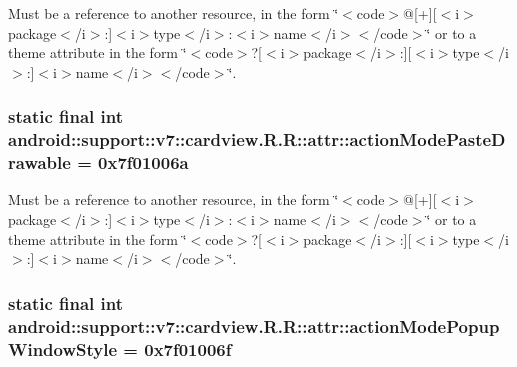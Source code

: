 Must be a reference to another resource, in the form \char`\"{}$<$code$>$@\mbox{[}+\mbox{]}\mbox{[}$<$i$>$package$<$/i$>$:\mbox{]}$<$i$>$type$<$/i$>$:$<$i$>$name$<$/i$>$$<$/code$>$\char`\"{} or to a theme attribute in the form \char`\"{}$<$code$>$?\mbox{[}$<$i$>$package$<$/i$>$:\mbox{]}\mbox{[}$<$i$>$type$<$/i$>$:\mbox{]}$<$i$>$name$<$/i$>$$<$/code$>$\char`\"{}. \hypertarget{classandroid_1_1support_1_1v7_1_1cardview_1_1_r_1_1attr_e3aac7d0f398623a4247e55c5359a1e8}{
\subsubsection[{actionModePasteDrawable}]{\setlength{\rightskip}{0pt plus 5cm}static final int android::support::v7::cardview.R.R::attr::actionModePasteDrawable = 0x7f01006a}}
\label{classandroid_1_1support_1_1v7_1_1cardview_1_1_r_1_1attr_e3aac7d0f398623a4247e55c5359a1e8}


Must be a reference to another resource, in the form \char`\"{}$<$code$>$@\mbox{[}+\mbox{]}\mbox{[}$<$i$>$package$<$/i$>$:\mbox{]}$<$i$>$type$<$/i$>$:$<$i$>$name$<$/i$>$$<$/code$>$\char`\"{} or to a theme attribute in the form \char`\"{}$<$code$>$?\mbox{[}$<$i$>$package$<$/i$>$:\mbox{]}\mbox{[}$<$i$>$type$<$/i$>$:\mbox{]}$<$i$>$name$<$/i$>$$<$/code$>$\char`\"{}. \hypertarget{classandroid_1_1support_1_1v7_1_1cardview_1_1_r_1_1attr_2bbee27240bad02c9e35319fbd855b2f}{
\subsubsection[{actionModePopupWindowStyle}]{\setlength{\rightskip}{0pt plus 5cm}static final int android::support::v7::cardview.R.R::attr::actionModePopupWindowStyle = 0x7f01006f}}
\label{classandroid_1_1support_1_1v7_1_1cardview_1_1_r_1_1attr_2bbee27240bad02c9e35319fbd855b2f}


